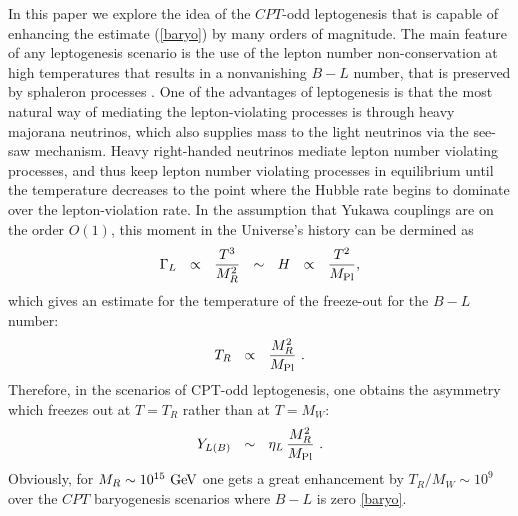 \documentclass[12pt]{revtex4}
\newcommand{\Mpl}{M_{\rm Pl}}
\newcommand{\Tsph}{T_{\rm sph}}
\newcommand{\GeV}{{\rm GeV}}
\begin{document}

    In this paper we explore the idea of the $CPT$-odd leptogenesis that is capable of 
    enhancing the estimate (\ref{baryo}) by many orders of magnitude. 
    The main feature of any leptogenesis scenario is the use of the lepton number non-conservation 
    at high temperatures that results in a nonvanishing $ B - L $ 
    number, that is preserved by sphaleron processes \cite{Fukugita:1986hr}. 
	One of the advantages of leptogenesis is that the most natural way of mediating
the lepton-violating processes is through
	heavy majorana neutrinos, which also supplies mass to the light neutrinos
	via the see-saw mechanism. 
	Heavy right-handed neutrinos mediate lepton number violating processes, and thus keep
	lepton number violating processes in equilibrium 
until the temperature decreases to the point where the Hubble rate begins to dominate
over the lepton-violation rate.
	In the assumption that Yukawa couplings are on the order $O(1)$, this moment in the Universe's 
	history can be dermined as 
\[
	\Gamma_L ~~\propto~~ \frac{T^3}{M_R^2} ~~\sim~~ H ~~\propto~~ \frac{T^2}{\Mpl},
\]
	which gives an estimate for the temperature of the freeze-out for the $B-L$ number:
\[
	T_R ~~\propto~~ \frac{M_R^2}{\Mpl}~.
\]
	Therefore, in the scenarios of CPT-odd leptogenesis, one obtains the asymmetry
	which freezes out at $ T = T_R $ rather than at $ T = M_W $:
\[
	Y_{L(B)} ~~\sim~~ \eta_L\, \frac{M_R^2}{\Mpl}~.
\]
	Obviously, for 	$ M_R \sim 10^{15}~\GeV $ one gets a great enhancement 
	by $ T_R/M_W \sim 10^{9}$ over the $CPT$ baryogenesis scenarios where 
$B-L$ is zero \eqref{baryo}.

\end{document}
